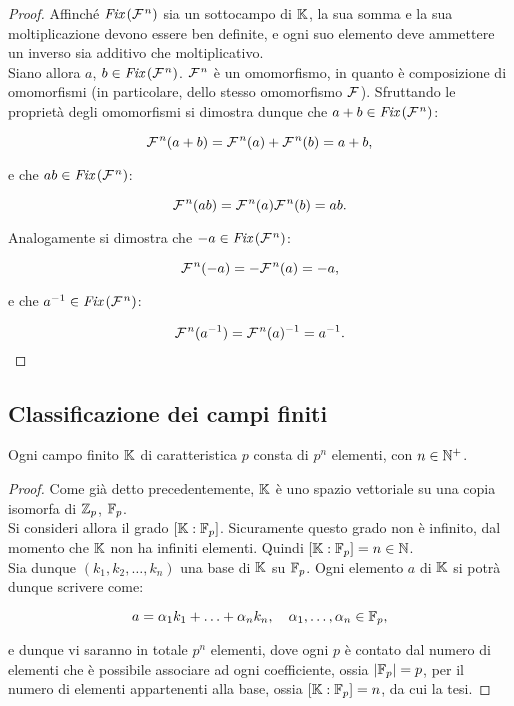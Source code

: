 \begin{proof}
    Affinché $\operatorname{\textit{Fix}\,}(\mathcal{F}{\mkern 1.5mu}^n)$ sia un sottocampo di $\mathbb{K}$,
    la sua somma e la sua moltiplicazione devono essere ben
    definite, e ogni suo elemento deve ammettere un inverso
    sia additivo che moltiplicativo. \\

    Siano allora $a$, $b \in \operatorname{\textit{Fix}\,}(\mathcal{F}{\mkern 1.5mu}^n)$.
    $\mathcal{F}{\mkern 1.5mu}^n$ è un omomorfismo, in quanto è composizione
    di omomorfismi (in particolare, dello stesso omomorfismo
    $\mathcal{F}{\mkern 1.5mu}$). Sfruttando le proprietà
    degli omomorfismi si dimostra dunque
    che $a+b \in \operatorname{\textit{Fix}\,}(\mathcal{F}{\mkern 1.5mu}^n)$:

    \[ \mathcal{F}{\mkern 1.5mu}^n(a+b) = \mathcal{F}{\mkern 1.5mu}^n(a) + \mathcal{F}{\mkern 1.5mu}^n(b) = a+b, \]

    \vskip 0.1in

    e che $ab \in \operatorname{\textit{Fix}\,}(\mathcal{F}{\mkern 1.5mu}^n)$:

    \[ \mathcal{F}{\mkern 1.5mu}^n(ab) = \mathcal{F}{\mkern 1.5mu}^n(a)\mathcal{F}{\mkern 1.5mu}^n(b) = ab. \]

    \vskip 0.1in

    Analogamente si dimostra che $-a \in \operatorname{\textit{Fix}\,}(\mathcal{F}{\mkern 1.5mu}^n)$:

    \[ \mathcal{F}{\mkern 1.5mu}^n(-a) = -\mathcal{F}{\mkern 1.5mu}^n(a) = -a, \]

    \vskip 0.1in

    e che $a^{-1} \in \operatorname{\textit{Fix}\,}(\mathcal{F}{\mkern 1.5mu}^n)$:

    \[ \mathcal{F}{\mkern 1.5mu}^n(a^{-1}) = \mathcal{F}{\mkern 1.5mu}^n(a)^{-1} = a^{-1}. \]

\end{proof}


\subsection{Classificazione dei campi finiti}

\begin{theorem}
    Ogni campo finito $\mathbb{K}$ di caratteristica $p$ consta
    di $p^n$ elementi, con $n \in \mathbb N^+$.
\end{theorem}

\begin{proof}
    Come già detto precedentemente, $\mathbb{K}$ è uno
    spazio vettoriale su una copia isomorfa di $\mathbb{Z}_p$,
    $\mathbb{F}_p$. \\

    Si consideri allora il grado $[\mathbb{K} : \mathbb{F}_p]$. Sicuramente
    questo grado non è infinito, dal momento che $\mathbb{K}$ non
    ha infiniti elementi. Quindi $[\mathbb{K} : \mathbb{F}_p] = n \in \mathbb N$. \\

    Sia dunque $(k_1, k_2, \ldots, k_n)$ una base di $\mathbb{K}$
    su $\mathbb{F}_p$. Ogni elemento $a$ di $\mathbb{K}$ si potrà dunque scrivere
    come:

    \[ a = \alpha_1 k_1 + \ldots + \alpha_n k_n, \quad \alpha_1, \ldots, \alpha_n \in \mathbb{F}_p,\]

    \vskip 0.1in

    e dunque vi saranno in totale $p^n$
    elementi, dove ogni $p$ è contato dal numero di elementi che è
    possibile associare ad ogni coefficiente, ossia $\left|\mathbb{F}_p\right| = p$,
    per il numero di elementi appartenenti alla base, ossia $[\mathbb{K} : \mathbb{F}_p] =
        n$, da cui la tesi.
\end{proof}


